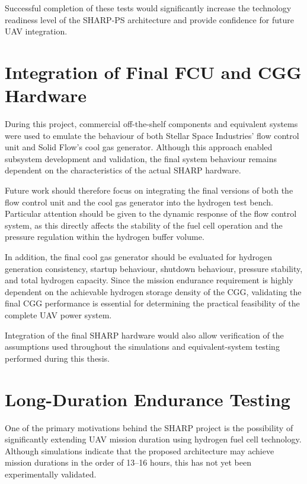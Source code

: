 Successful completion of these tests would significantly increase the technology readiness level of the SHARP-PS architecture and provide confidence for future UAV integration.

\section{Integration of Final FCU and CGG Hardware}
During this project, commercial off-the-shelf components and equivalent systems were used to emulate the behaviour of both Stellar Space Industries’ flow control unit and Solid Flow’s cool gas generator. Although this approach enabled subsystem development and validation, the final system behaviour remains dependent on the characteristics of the actual SHARP hardware.

Future work should therefore focus on integrating the final versions of both the flow control unit and the cool gas generator into the hydrogen test bench. Particular attention should be given to the dynamic response of the flow control system, as this directly affects the stability of the fuel cell operation and the pressure regulation within the hydrogen buffer volume.

In addition, the final cool gas generator should be evaluated for hydrogen generation consistency, startup behaviour, shutdown behaviour, pressure stability, and total hydrogen capacity. Since the mission endurance requirement is highly dependent on the achievable hydrogen storage density of the CGG, validating the final CGG performance is essential for determining the practical feasibility of the complete UAV power system.

Integration of the final SHARP hardware would also allow verification of the assumptions used throughout the simulations and equivalent-system testing performed during this thesis.

\section{Long-Duration Endurance Testing}
One of the primary motivations behind the SHARP project is the possibility of significantly extending UAV mission duration using hydrogen fuel cell technology. Although simulations indicate that the proposed architecture may achieve mission durations in the order of 13--16 hours, this has not yet been experimentally validated.

